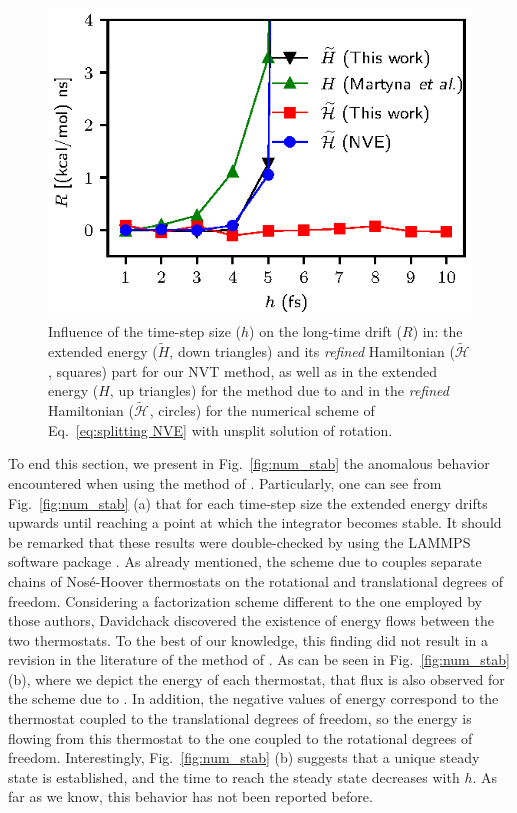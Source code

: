 \documentclass[
journal=jctcce,
layout=twocolumn
]{achemso}
\newcommand{\Ham}[1]{{\mathcal H}_\text{#1}}    %
\newcommand{\refined}[1]{\widetilde{#1}}
\begin{document}
\begin{figure}
	\includegraphics{Figures/energy_drift.eps}
    \caption{Influence of the time-step size ($h$) on the long-time drift ($R$) in: the extended energy ($\refined{H}$, down triangles) and its \textit{refined} Hamiltonian ($\refined{\Ham{}}$, squares) part for our NVT method, as well as in the extended energy ($H$, up triangles) for the method due to \citeauthor{Martyna_1996} \cite{Martyna_1996} and in the \textit{refined} Hamiltonian ($\refined{\Ham{}}$, circles) for the numerical scheme of Eq.~\ref{eq:splitting NVE} with unsplit solution of rotation.}
	\label{fig:energy_drift}
\end{figure}

To end this section, we present in Fig.~\ref{fig:num_stab} the anomalous behavior encountered when using the method of \citeauthor{Kamberaj_2005} \cite{Kamberaj_2005}.
Particularly, one can see from Fig.~\ref{fig:num_stab} (a) that for each time-step size the extended energy drifts upwards until reaching a point at which the integrator becomes stable.
It should be remarked that these results were double-checked by using the LAMMPS software package \cite{Plimpton_1995}. 
As already mentioned, the scheme due to \citeauthor{Kamberaj_2005} \cite{Kamberaj_2005} couples separate chains of Nos\'{e}-Hoover thermostats on the rotational and translational degrees of freedom.
Considering a factorization scheme different to the one employed by those authors, Davidchack \cite{Davidchack_2009} discovered the existence of energy flows between the two thermostats.
To the best of our knowledge, this finding did not result in a revision in the literature of the method of \citeauthor{Kamberaj_2005} \cite{Kamberaj_2005}.
As can be seen in Fig.~\ref{fig:num_stab} (b), where we depict the energy of each thermostat, that flux is also observed for the scheme due to \citeauthor{Kamberaj_2005} \cite{Kamberaj_2005}.
In addition, the negative values of energy correspond to the thermostat coupled to the translational degrees of freedom, so the energy is flowing from this thermostat to the one coupled to the rotational degrees of freedom.
Interestingly, Fig.~\ref{fig:num_stab} (b) suggests that a unique steady state is established, and the time to reach the steady state decreases with $h$. As far as we know, this behavior has not been reported before.
\end{document}
